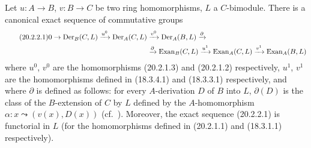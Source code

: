 \begin{theorem}[20.2.2]
\label{0.20.2.2}
Let $u:A\to B$, $v:B\to C$ be two ring homomorphisms, $L$ a $C$-bimodule.
There is a canonical exact sequence of commutative groups
\begin{align}
\tag{20.2.2.1}
  \label{0.20.2.2.1}
  0\to\operatorname{Der}_B(C,L)\xrightarrow{u^0}\operatorname{Der}_A(C,L)&\xrightarrow{v^0}\operatorname{Der}_A(B,L)\xrightarrow{\partial} \\
  &\xrightarrow{\partial}\operatorname{Exan}_B(C,L)\xrightarrow{u^1}\operatorname{Exan}_A(C,L)\xrightarrow{v^1}\operatorname{Exan}_A(B,L) \notag
\end{align}
where $u^0$, $v^0$ are the homomorphisms \textup{(}20.2.1.3\textup{)} and \textup{(}20.2.1.2\textup{)} respectively, $u^1$, $v^1$ are the homomorphisms defined in \textup{(18.3.4.1)} and \textup{(18.3.3.1)} respectively, and where $\partial$ is defined as follows: for every $A$-derivation $D$ of $B$ into $L$, $\partial(D)$ is the class of the $B$-extension of $C$ by $L$ defined by the $A$-homomorphism $\alpha:x\leadsto(v(x),D(x))$ \textup{(}cf.\ \textup{)}.
Moreover, the exact sequence \textup{(}20.2.2.1\textup{)} is functorial in $L$ \textup{(}for the homomorphisms defined in \textup{(}20.2.1.1\textup{)} and \textup{(}18.3.1.1\textup{)} respectively\textup{)}.
\end{theorem}

